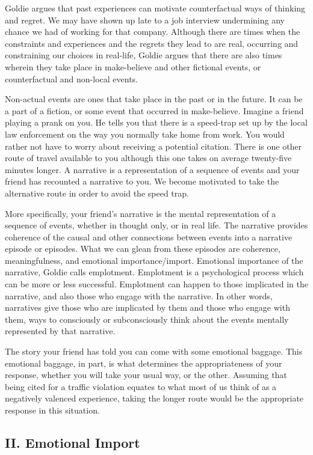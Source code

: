 \documentclass[
]{article}
\begin{document}
Goldie argues that past experiences can motivate counterfactual ways of
thinking and regret. We may have shown up late to a job interview
undermining any chance we had of working for that company. Although
there are times when the constraints and experiences and the regrets
they lead to are real, occurring and constraining our choices in
real-life, Goldie argues that there are also times wherein they take
place in make-believe and other fictional events, or counterfactual and
non-local events.

Non-actual events are ones that take place in the past or in the future.
It can be a part of a fiction, or some event that occurred in
make-believe. Imagine a friend playing a prank on you. He tells you that
there is a speed-trap set up by the local law enforcement on the way you
normally take home from work. You would rather not have to worry about
receiving a potential citation. There is one other route of travel
available to you although this one takes on average twenty-five minutes
longer. A narrative is a representation of a sequence of events and your
friend has recounted a narrative to you. We become motivated to take the
alternative route in order to avoid the speed trap.

More specifically, your friend's narrative is the mental representation
of a sequence of events, whether in thought only, or in real life. The
narrative provides coherence of the causal and other connections between
events into a narrative episode or episodes. What we can glean from
these episodes are coherence, meaningfulness, and emotional
importance/import. Emotional importance of the narrative, Goldie calls
emplotment. Emplotment is a psychological process which can be more or
less successful. Emplotment can happen to those implicated in the
narrative, and also those who engage with the narrative. In other words,
narratives give those who are implicated by them and those who engage
with them, ways to consciously or subconsciously think about the events
mentally represented by that narrative.

The story your friend has told you can come with some emotional baggage.
This emotional baggage, in part, is what determines the appropriateness
of your response, whether you will take your usual way, or the other.
Assuming that being cited for a traffic violation equates to what most
of us think of as a negatively valenced experience, taking the longer
route would be the appropriate response in this situation.

\hypertarget{ii.-emotional-import}{%
\subsection{II. Emotional Import}\label{ii.-emotional-import}}
\end{document}
